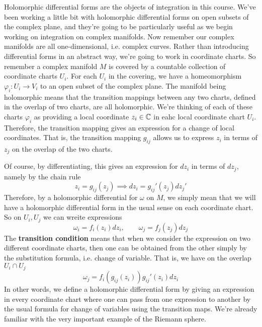 \documentclass{article}
\begin{document}
Holomorphic differential forms are the objects of integration in this course. We've been working a little bit with holomorphic differential forms on open subsets of the complex plane, and they're going to be particularly useful as we begin working on integration on complex manifolds. Now remember our complex manifolds are all one-dimensional, i.e. complex curves. Rather than introducing differential forms in an abstract way, we're going to work in coordinate charts. So remember a complex manifold \(M\) is covered by a countable collection of coordinate charts \(U_i\). For each \(U_i\) in the covering, we have a homeomorphism \(\varphi_i: U_i \to V_i\) to an open subset of the complex plane. The manifold being holomorphic means that the transition mappings between any two charts, defined in the overlap of two charts, are all holomorphic. We're thinking of each of these charts \(\varphi_i\) as providing a local coordinate \(z_i \in \mathbb{C}\) in eahc local coordinate chart \(U_i\). Therefore, the transition mapping gives an expression for a change of local coordinates. That is, the transition mapping \(g_{ij}\) allows us to express \(z_i\) in terms of \(z_j\) on the overlap of the two charts.

Of course, by differentiating, this gives an expression for \(dz_i\) in terms of \(dz_j\), namely by the chain rule
\begin{equation}
  z_i = g_{ij}(z_j) \implies dz_i = g_{ij}'(z_j)dz_j'
\end{equation}
Therefore, by a holomorphic differential for \(\omega\) on \(M\), we simply mean that we will have a holomorphic differential form in the usual sense on each coordinate chart. So on \(U_i, U_j\) we can wreite expressions
\begin{equation}
  \omega_i = f_i(z_i)dz_i, \qquad \omega_j = f_j(z_j)dz_j
\end{equation}
The \textbf{transition condition} means that when we consider the expression on two different coordinate charts, then one can be obtained from the other simply by the substitution formula, i.e. change of variable. That is, we have on the overlap \(U_i \cap U_j\)
\begin{equation}
  \omega_j = f_i(g_{ij}(z_i))g_{ij}'(z_i)dz_i
\end{equation}
In other words, we define a holomorphic differential form by giving an expression in every coordinate chart where one can pass from one expression to another by the usual formula for change of variables using the transition maps. We're already familiar with the very important example of the Riemann sphere.
\end{document}
